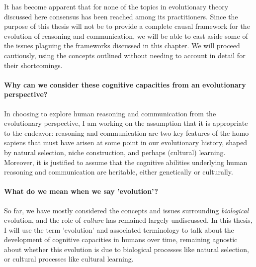 It has become apparent that for none of the topics in evolutionary theory discussed here consensus has been reached among its practitioners. Since the purpose of this thesis will not be to provide a complete causal framework for the evolution of reasoning and communication, we will be able to cast aside some of the issues plaguing the frameworks discussed in this chapter. We will proceed cautiously, using the concepts outlined without needing to account in detail for their shortcomings.

\paragraph{Why can we consider these cognitive capacities from an evolutionary perspective?}

In choosing to explore human reasoning and communication from the evolutionary perspective, I am working on the assumption that it is appropriate to the endeavor: reasoning and communication are two key features of the homo sapiens that must have arisen at some point in our evolutionary history, shaped by natural selection, niche construction, and perhaps (cultural) learning. Moreover, it is justified to assume that the cognitive abilities underlying human reasoning and communication are heritable, either genetically or culturally.

\paragraph{What do we mean when we say 'evolution'?}
So far, we have mostly considered the concepts and issues surrounding \emph{biological} evolution, and the role of \emph{culture} has remained largely undiscussed.
In this thesis, I will use the term 'evolution' and associated terminology to talk about the development of cognitive capacities in humans over time, remaining agnostic about whether this evolution is due to biological processes like natural selection, or cultural processes like cultural learning.

